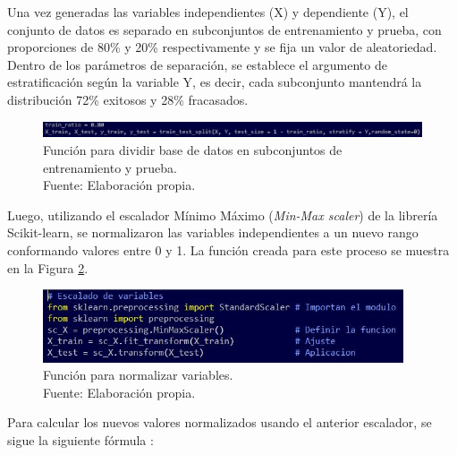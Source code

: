 Una vez generadas las variables independientes (X) y dependiente (Y), el conjunto de datos es separado en subconjuntos de entrenamiento y prueba, con proporciones de 80\% y 20\% respectivamente \citep{pr_yuan2016textanalytics,pr_yu2018deeplearning,pr_chen2019keywords_crowdfunding,pr_mitra2014phrases,pr_sawhney2016usingLT} y se fija un valor de aleatoriedad. Dentro de los parámetros de separación, se establece el argumento de estratificación según la variable Y, es decir, cada subconjunto mantendrá la distribución 72\% exitosos y 28\% fracasados.

\begin{figure}[!ht]
	\begin{center}
		\includegraphics[width=1.00\textwidth]{4/figures/train_test_split.jpg}
		\caption[Función para dividir base de datos en subconjuntos de entrenamiento y prueba]{Función para dividir base de datos en subconjuntos de entrenamiento y prueba.\\
			Fuente: Elaboración propia.}
		\label{4:fig28}
	\end{center}
\end{figure}

Luego, utilizando el escalador Mínimo Máximo (\textit{Min-Max scaler}) de la librería Scikit-learn, se normalizaron las variables independientes a un nuevo rango conformando valores entre 0 y 1. La función creada para este proceso se muestra en la Figura \ref{4:fig29}.

\begin{figure}[!ht]
	\begin{center}
		\includegraphics[width=0.95\textwidth]{4/figures/metadata_scaler_function.jpg}
		\caption[Función para normalizar variables]{Función para normalizar variables.\\
			Fuente: Elaboración propia.}
		\label{4:fig29}
	\end{center}
\end{figure}

Para calcular los nuevos valores normalizados usando el anterior escalador, se sigue la siguiente fórmula \citep{tec_minmaxscaler,tec_scikitlearn,tec_datascaling}:

